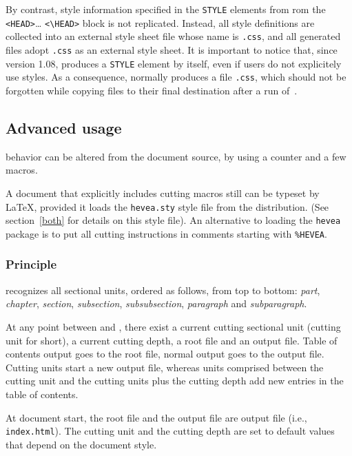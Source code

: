 \label{hacha:style}%
By contrast, style information specified in the \verb+STYLE+ elements
from rom the \verb+<HEAD>+\ldots{} \verb+<\HEAD>+
block is not replicated. Instead, all style definitions are collected into an
external style sheet file whose name is \texttt{.css},
and all generated {\html} files adopt \texttt{.css} as
an external style sheet.
It is important to notice that, since version 1.08, \hevea{} produces
a \verb+STYLE+ element by itself, even if users do not explicitely
use styles. As a consequence,
\hacha{} normally produces a
file \texttt{.css}, which should not be forgotten while
copying files to their final destination after a run of~\hacha.

\subsection{Advanced usage}

\hacha{} behavior can be altered from the document source, by using
a counter and a few macros.

A document that explicitly includes cutting macros still can be typeset by
\LaTeX{}, provided it loads the
\texttt{hevea.sty} style file from the \hevea{} distribution.
(See section~\ref{both} for details on this style file).
An alternative to loading the \texttt{hevea} package is to put
all cutting instructions in comments starting with \verb+%HEVEA+.



\subsubsection{Principle}
{\hacha} recognizes all sectional units, ordered as follows, from
top to bottom: {\em
part}, {\em chapter},
{\em section}, {\em subsection}, {\em subsubsection},
\emph{paragraph} and \emph{subparagraph}.

At any point between \verb++ and
\verb++,
there exist a current cutting sectional unit (cutting unit for short),
a current cutting depth, a root file and an output file.
Table of contents output goes to the root file, normal output goes to
the output file.
Cutting units start a new output file, whereas units comprised between the
cutting unit and the cutting units plus the cutting depth add new
entries in the table of contents.

At document start, the root file and the output file are {\hacha}
output file (i.e., \texttt{index.html}).
The cutting unit and the cutting depth are set to default values that
depend on the document style.

